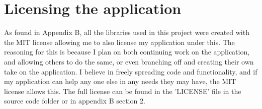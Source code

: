 \section{Licensing the application}

As found in Appendix B, all the libraries used in this project were created with the MIT license allowing me to also license my application under this. The reasoning for this is because I plan on both continuing work on the application, and allowing others to do the same, or even branching off and creating their own take on the application. I believe in freely spreading code and functionality, and if my application can help any one else in any needs they may have, the MIT license allows this. The full license can be found in the 'LICENSE' file in the source code folder or in appendix B section 2.